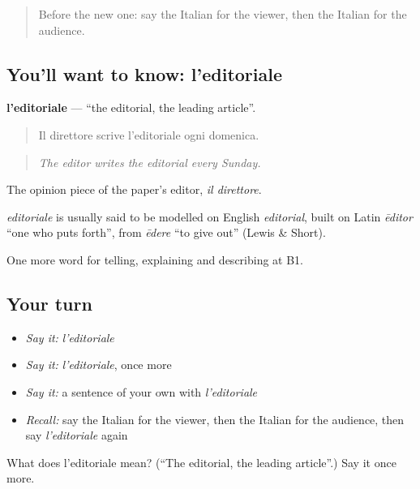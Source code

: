 \label{lesson:IT-C289-editoriale}



\begin{quote}
Before the new one: say the Italian for the viewer, then the Italian for the audience.
\end{quote}

\subsection*{You'll want to know: l'editoriale}
\textbf{l'editoriale} — \textquotedblleft{}the editorial, the leading article\textquotedblright{}.

\begin{quote}
Il direttore scrive l'editoriale ogni domenica.
\end{quote}

\begin{quote}
\emph{The editor writes the editorial every Sunday.}
\end{quote}

The opinion piece of the paper's editor, \emph{il direttore}.

\begin{cousinweb}
\emph{editoriale} is usually said to be modelled on English \emph{editorial}, built on Latin \emph{ēditor} \textquotedblleft{}one who puts forth\textquotedblright{}, from \emph{ēdere} \textquotedblleft{}to give out\textquotedblright{} (Lewis \& Short).
\end{cousinweb}

\begin{grammarlens}[title={What you've built}]
One more word for telling, explaining and describing at B1.
\end{grammarlens}

\subsection*{Your turn}
\begin{itemize}
\raggedright
  \item \emph{Say it:} \emph{l'editoriale}
  \item \emph{Say it:} \emph{l'editoriale}, once more
  \item \emph{Say it:} a sentence of your own with \emph{l'editoriale}
  \item \emph{Recall:} say the Italian for the viewer, then the Italian for the audience, then say \emph{l'editoriale} again
\end{itemize}

\begin{tcolorbox}[breakable,colback=teal!4,colframe=teal!35!black,title={Before you move on}]
What does l'editoriale mean? (\textquotedblleft{}The editorial, the leading article\textquotedblright{}.) Say it once more.
\end{tcolorbox}
